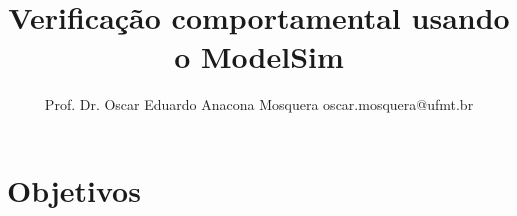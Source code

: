 \documentclass{CPSPresentation}
\title[Minicurso FPGAs]{\huge Verificação comportamental usando o ModelSim} %
\author[Prof. Dr. Oscar Eduardo Anacona Mosquera]{Prof. Dr. Oscar Eduardo Anacona Mosquera \newline\newline 
\scriptsize{oscar.mosquera@ufmt.br}
}%
\begin{document}
\begin{frame}[plain]
\titlepage

\end{frame}



\section{Objetivos}
\end{document}
